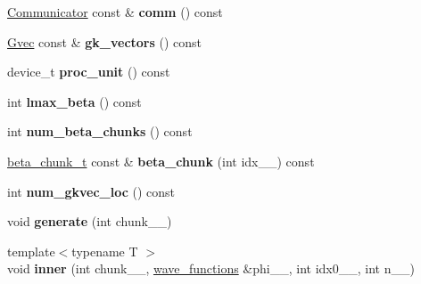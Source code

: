 \begin{DoxyCompactItemize}
\item 
\hypertarget{classsirius_1_1_beta__projectors_a91ff5122a3aaf5c6ccd63a8934d74640}{}\hyperlink{classsddk_1_1_communicator}{Communicator} const \& {\bfseries comm} () const \label{classsirius_1_1_beta__projectors_a91ff5122a3aaf5c6ccd63a8934d74640}

\item 
\hypertarget{classsirius_1_1_beta__projectors_a9ea70bbb773b5d5bc27a92270745d96b}{}\hyperlink{classsddk_1_1_gvec}{Gvec} const \& {\bfseries gk\+\_\+vectors} () const \label{classsirius_1_1_beta__projectors_a9ea70bbb773b5d5bc27a92270745d96b}

\item 
\hypertarget{classsirius_1_1_beta__projectors_ada77c14813b24c06946b4f926371f14d}{}device\+\_\+t {\bfseries proc\+\_\+unit} () const \label{classsirius_1_1_beta__projectors_ada77c14813b24c06946b4f926371f14d}

\item 
\hypertarget{classsirius_1_1_beta__projectors_a59edc3d21c78a59ff521d9cb2f39de09}{}int {\bfseries lmax\+\_\+beta} () const \label{classsirius_1_1_beta__projectors_a59edc3d21c78a59ff521d9cb2f39de09}

\item 
\hypertarget{classsirius_1_1_beta__projectors_a30c4e5198a288e47b34e4b331590dcea}{}int {\bfseries num\+\_\+beta\+\_\+chunks} () const \label{classsirius_1_1_beta__projectors_a30c4e5198a288e47b34e4b331590dcea}

\item 
\hypertarget{classsirius_1_1_beta__projectors_ad514b9995e9fcd73677274d6e271f856}{}\hyperlink{structsirius_1_1_beta__projectors_1_1beta__chunk__t}{beta\+\_\+chunk\+\_\+t} const \& {\bfseries beta\+\_\+chunk} (int idx\+\_\+\+\_\+) const \label{classsirius_1_1_beta__projectors_ad514b9995e9fcd73677274d6e271f856}

\item 
\hypertarget{classsirius_1_1_beta__projectors_a7aa9f586aece723de56560a41b6386d9}{}int {\bfseries num\+\_\+gkvec\+\_\+loc} () const \label{classsirius_1_1_beta__projectors_a7aa9f586aece723de56560a41b6386d9}

\item 
\hypertarget{classsirius_1_1_beta__projectors_a3fb0a62ab424982d69056dcb54cf4374}{}void {\bfseries generate} (int chunk\+\_\+\+\_\+)\label{classsirius_1_1_beta__projectors_a3fb0a62ab424982d69056dcb54cf4374}

\item 
\hypertarget{classsirius_1_1_beta__projectors_a654ca8760dd2190f8a3bb31715e8ac94}{}{\footnotesize template$<$typename T $>$ }\\void {\bfseries inner} (int chunk\+\_\+\+\_\+, \hyperlink{classsddk_1_1wave__functions}{wave\+\_\+functions} \&phi\+\_\+\+\_\+, int idx0\+\_\+\+\_\+, int n\+\_\+\+\_\+)\label{classsirius_1_1_beta__projectors_a654ca8760dd2190f8a3bb31715e8ac94}


\end{DoxyCompactItemize}

